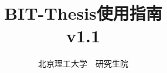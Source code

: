 \documentclass[oneside, master]{BIT-thesis-grd}
\begin{document}

\title{BIT-Thesis使用指南\\ v1.1}
\author{北京理工大学~~研究生院}

\maketitle

\frontmatter

\tableofcontents

\let\origaddvspace\addvspace
\renewcommand{\addvspace}[1]{}
\listoffigures
\listoftables
\renewcommand{\addvspace}[1]{\origaddvspace{#1}}


% 

\mainmatter  %







%


\appendix




\backmatter 

%

\end{document}
